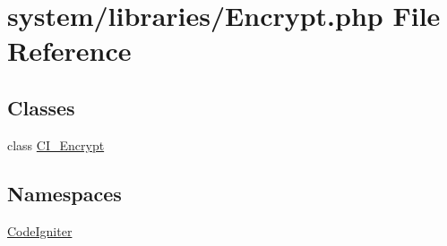 \hypertarget{_encrypt_8php}{}\section{system/libraries/\+Encrypt.php File Reference}
\label{_encrypt_8php}
\subsection*{Classes}
\begin{DoxyCompactItemize}
\item 
class \mbox{\hyperlink{class_c_i___encrypt}{C\+I\+\_\+\+Encrypt}}
\end{DoxyCompactItemize}
\subsection*{Namespaces}
\begin{DoxyCompactItemize}
\item 
 \mbox{\hyperlink{namespace_code_igniter}{Code\+Igniter}}
\end{DoxyCompactItemize}
